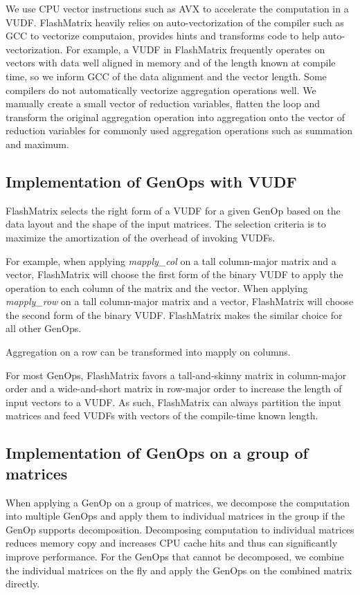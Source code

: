 We use CPU vector instructions such as AVX \cite{avx} to accelerate
the computation in a VUDF. FlashMatrix heavily relies on auto-vectorization
of the compiler such as GCC to vectorize computaion, provides hints and
transforms code to help auto-vectorization. For example, a VUDF in FlashMatrix
frequently operates on vectors with data well aligned in memory and of
the length known at compile time, so we inform GCC of the data alignment
and the vector length. Some compilers do not automatically vectorize
aggregation operations well. We manually create a small vector of reduction
variables, flatten the loop and transform the original aggregation operation
into aggregation onto the vector of reduction variables for commonly used
aggregation operations such as summation and maximum.

\subsection{Implementation of GenOps with VUDF}

FlashMatrix selects the right form of a VUDF for a given GenOp based on the data
layout and the shape of the input matrices. The selection criteria is to maximize
the amortization of the overhead of invoking VUDFs.

For example, when applying \textit{mapply\_col} on
a tall column-major matrix and a vector, FlashMatrix will choose the first form
of the binary VUDF to apply the operation to each column of the matrix and
the vector. When applying \textit{mapply\_row} on a tall column-major matrix
and a vector, FlashMatrix will choose the second form of the binary VUDF.
FlashMatrix makes the similar choice for all other GenOps.

Aggregation on a row can be transformed into mapply on columns.

For most GenOps, FlashMatrix favors a tall-and-skinny matrix in column-major
order and a wide-and-short matrix in row-major order to increase the length
of input vectors to a VUDF. As such, FlashMatrix can always partition the input
matrices and feed VUDFs with vectors of the compile-time known length.

\subsection{Implementation of GenOps on a group of matrices}

When applying a GenOp on a group of matrices,
we decompose the computation into multiple GenOps and apply them to individual
matrices in the group if the GenOp supports decomposition. Decomposing computation
to individual matrices reduces memory copy and increases CPU cache hits and thus
can significantly improve performance. For the GenOps that cannot be decomposed,
we combine the individual matrices on the fly and apply the GenOps on the combined
matrix directly.

